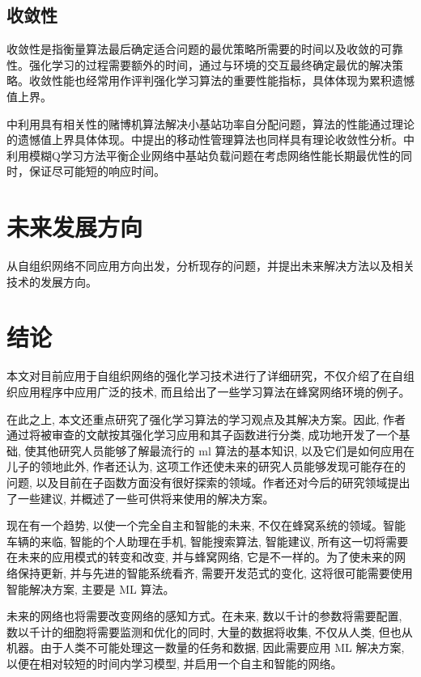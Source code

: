 \documentclass{IEEEtran}
\begin{document}
\subsection{收敛性}
收敛性是指衡量算法最后确定适合问题的最优策略所需要的时间以及收敛的可靠性。强化学习的过程需要额外的时间，通过与环境的交互最终确定最优的解决策略。收敛性能也经常用作评判强化学习算法的重要性能指标，具体体现为累积遗憾值上界。

\cite{Wang2017}中利用具有相关性的赌博机算法解决小基站功率自分配问题，算法的性能通过理论的遗憾值上界具体体现。\cite{Shen2016}中提出的移动性管理算法也同样具有理论收敛性分析。\cite{Munoz2013}中利用模糊Q学习方法平衡企业网络中基站负载问题在考虑网络性能长期最优性的同时，保证尽可能短的响应时间。

\section{未来发展方向}
\label{sec:Conclusion}
从自组织网络不同应用方向出发，分析现存的问题，并提出未来解决方法以及相关技术的发展方向。

\section{结论}

本文对目前应用于自组织网络的强化学习技术进行了详细研究，不仅介绍了在自组织应用程序中应用广泛的技术, 而且给出了一些学习算法在蜂窝网络环境的例子。

在此之上, 本文还重点研究了强化学习算法的学习观点及其解决方案。因此, 作者通过将被审查的文献按其强化学习应用和其子函数进行分类, 成功地开发了一个基础, 使其他研究人员能够了解最流行的 ml 算法的基本知识, 以及它们是如何应用在儿子的领地此外, 作者还认为, 这项工作还使未来的研究人员能够发现可能存在的问题, 以及目前在子函数方面没有很好探索的领域。作者还对今后的研究领域提出了一些建议, 并概述了一些可供将来使用的解决方案。

现在有一个趋势, 以使一个完全自主和智能的未来, 不仅在蜂窝系统的领域。智能车辆的来临, 智能的个人助理在手机, 智能搜索算法, 智能建议, 所有这一切将需要在未来的应用模式的转变和改变, 并与蜂窝网络, 它是不一样的。为了使未来的网络保持更新, 并与先进的智能系统看齐, 需要开发范式的变化, 这将很可能需要使用智能解决方案, 主要是 ML 算法。

未来的网络也将需要改变网络的感知方式。在未来, 数以千计的参数将需要配置, 数以千计的细胞将需要监测和优化的同时, 大量的数据将收集, 不仅从人类, 但也从机器。由于人类不可能处理这一数量的任务和数据, 因此需要应用 ML 解决方案, 以便在相对较短的时间内学习模型, 并启用一个自主和智能的网络。





\end{document}
